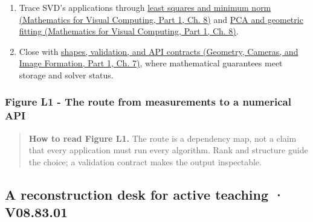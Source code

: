 \begin{enumerate}
\item
  Trace SVD's applications through \href{../02-Mathematics-for-Visual-Computing-P01/main.pdf\#nameddest=02-foundations-ii-ch024-least-squares-from-decoupling-then-minimum-norm}{least squares and minimum norm (Mathematics for Visual Computing, Part 1, Ch. 8)} and \href{../02-Mathematics-for-Visual-Computing-P01/main.pdf\#nameddest=02-foundations-ii-ch024-centered-measurements-reveal-principal-directions}{PCA and geometric fitting (Mathematics for Visual Computing, Part 1, Ch. 8)}.
\item
  Close with \href{../03-Geometry-Cameras-and-Image-Formation-P01/main.pdf\#nameddest=02-foundations-ii-ch038-an-svd-api-begins-with-shapes-and-guarantees}{shapes, validation, and API contracts (Geometry, Cameras, and Image Formation, Part 1, Ch. 7)}, where mathematical guarantees meet storage and solver status.
\end{enumerate}

\subsubsection{Figure L1 - The route from measurements to a numerical API}\label{02-foundations-ii-ch039-figure-l1---the-route-from-measurements-to-a-numerical-api}

\hypertarget{02-foundations-ii-ch039-figure-l1---the-route-from-measurements-to-a-numerical-api}{}


\begin{quote}
\textbf{How to read Figure L1.} The route is a dependency map, not a claim that every application must run every algorithm. Rank and structure guide the choice; a validation contract makes the output inspectable.
\end{quote}

\subsection{A reconstruction desk for active teaching · V08.83.01}\label{02-foundations-ii-ch039-a-reconstruction-desk-for-active-teaching-v08.83.01}

\hypertarget{02-foundations-ii-ch039-a-reconstruction-desk-for-active-teaching-v08.83.01}{}

